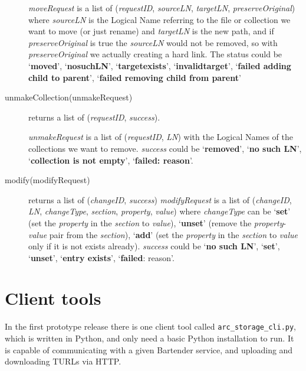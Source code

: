 \documentclass{book}
\begin{document}
\begin{description}
    \emph{moveRequest} is a list of (\emph{requestID}, \emph{sourceLN}, \emph{targetLN}, \emph{preserveOriginal}) where \emph{sourceLN} is the Logical Name referring to the file or collection we want to move (or just rename) and \emph{targetLN} is the new path, and if \emph{preserveOriginal} is true the \emph{sourceLN} would not be removed, so with \emph{preserveOriginal} we actually creating a hard link. The status could be `\textbf{moved}', `\textbf{nosuchLN}', `\textbf{targetexists}', `\textbf{invalidtarget}', `\textbf{failed adding child to parent}', `\textbf{failed removing child from parent}'
    
    \item[unmakeCollection(unmakeRequest)] returns a list of (\emph{requestID}, \emph{success}).
    
    \emph{unmakeRequest} is a list of (\emph{requestID}, \emph{LN}) with the Logical Names of the collections we want to remove. \emph{success} could be `\textbf{removed}', `\textbf{no such LN}', `\textbf{collection is not empty}', `\textbf{failed: reason}'.
    
    \item[modify(modifyRequest)] returns a list of (\emph{changeID}, \emph{success})
    \emph{modifyRequest} is a list of (\emph{changeID}, \emph{LN}, \emph{changeType}, \emph{section}, \emph{property}, \emph{value}) where \emph{changeType} can be `\textbf{set}’ (set the \emph{property} in the \emph{section} to \emph{value}), `\textbf{unset}’ (remove the \emph{property}-\emph{value} pair from the \emph{section}), `\textbf{add}’ (set the \emph{property} in the \emph{section} to \emph{value} only if it is not exists already). \emph{success} could be `\textbf{no such LN}', `\textbf{set}', `\textbf{unset}', `\textbf{entry exists}', `\textbf{failed}: reason'.
    
\end{description}


\newpage

\section{Client tools} %
\label{sec:client_tools}

In the first prototype release there is one client tool called \verb!arc_storage_cli.py!, which is written in Python, and only need a basic Python installation to run. It is capable of communicating with a given Bartender service, and uploading and downloading TURLs via HTTP.
\end{document}
